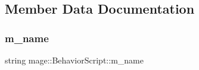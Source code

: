 \subsection{Member Data Documentation}
\hypertarget{classmage_1_1_behavior_script_a3e55dd6e720dc72c3f613b917e73344b}{}\label{classmage_1_1_behavior_script_a3e55dd6e720dc72c3f613b917e73344b} 
\subsubsection{\texorpdfstring{m\+\_\+name}{m\_name}}
{\footnotesize\ttfamily string mage\+::\+Behavior\+Script\+::m\+\_\+name\hspace{0.3cm}{\ttfamily [private]}}

